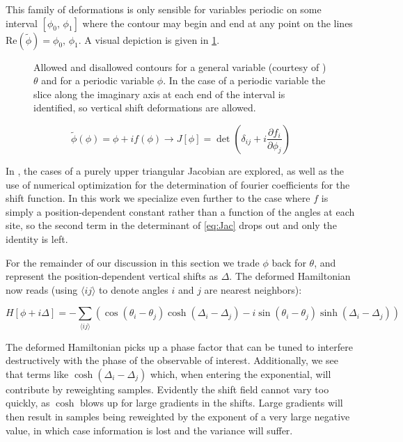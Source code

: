 \documentclass[12pt]{article}
\begin{document}
This family of deformations is only sensible for variables periodic on some interval $[\phi_0,\,\phi_1]$ where the contour may begin and end at any point on the 
lines $\mathrm{Re}(\tilde{\phi}) = \phi_0,\,\phi_1$. A visual depiction is given in \ref{fig:contours}.

\begin{figure}
	\begin{center}
	
	\end{center}
	\caption[Vertical Shift Illustration]{Allowed and disallowed contours for a general variable (courtesy of \cite{Detmold_2021}) $\theta$ and for a periodic variable $\phi$.
	In the case of a periodic variable the slice along the imaginary axis at each end of the interval is identified, 
	so vertical shift deformations are allowed.}
	\label{fig:contours}
\end{figure}

\begin{equation} \label{eq:Jac}
	\tilde{\phi}(\phi) = \phi + if(\phi) \rightarrow J[\phi] = \det\left(\delta_{ij} + i \frac{\partial f_i}{\partial \phi_j} \right)
\end{equation}

In \cite{Detmold_2021}, the cases of a purely upper triangular Jacobian are explored, as well as the use of numerical optimization for the determination of fourier coefficients
for the shift function. In this work we specialize even further to the case where $f$ is simply a position-dependent constant rather than a function of the angles
at each site, so the second term in the determinant of \ref{eq:Jac} drops out and only the identity is left. 

For the remainder of our discussion in this section
we trade $\phi$ back for $\theta$, and represent the position-dependent vertical shifts as $\Delta$. The deformed Hamiltonian now reads 
(using $\langle ij \rangle$ to denote angles $i$ and $j$ are nearest neighbors):

\begin{equation} \label{eq:deformed_ham}
	H[\phi + i \Delta] = -\sum_{\langle ij \rangle} \left(\cos(\theta_i-\theta_j)\cosh(\Delta_i-\Delta_j) -
	i \sin(\theta_i-\theta_j)\sinh(\Delta_i-\Delta_j) \right)
\end{equation}

The deformed Hamiltonian picks up a phase factor that can be tuned to interfere destructively with the phase of the observable of interest. 
Additionally, we see that terms like $\cosh(\Delta_i - \Delta_j)$ which, when entering the exponential, will contribute by reweighting samples. 
Evidently the shift field cannot vary too quickly, as $\cosh$ blows up for large gradients in the shifts. Large gradients will then result in samples being
reweighted by the exponent of a very large negative value, in which case information is lost and the variance will suffer.
\end{document}
